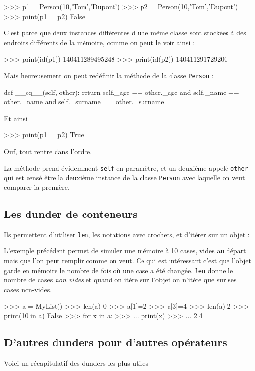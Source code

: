 \documentclass[a4paper,12pt,french]{book}
\begin{document}
\begin{pythonshell}
>>> p1 = Person(10,'Tom','Dupont')
>>> p2 = Person(10,'Tom','Dupont')
>>> print(p1==p2)
False
\end{pythonshell}
C'est parce que deux instances différentes d'une même classe sont stockées à des endroits différents de la mémoire, comme on peut le voir ainsi :
\begin{pythonshell}
>>> print(id(p1))
    140411289495248
>>> print(id(p2))
    140411291729200
\end{pythonshell}
Mais heureusement on peut redéfinir la méthode  de la classe \texttt{Person} :
\begin{pythoncode}
def __eq__(self, other):
    return self._age == other._age and self._name == other._name and self._surname == other._surname
\end{pythoncode}
Et ainsi
\begin{pythonshell}
>>> print(p1==p2)
True
\end{pythonshell}
Ouf, tout rentre dans l'ordre.
\begin{remarque}[]
La méthode  prend évidemment \texttt{self} en paramètre, et un deuxième appelé \texttt{other} qui est censé être la deuxième instance de la classe \texttt{Person} avec laquelle on veut comparer la première.
\end{remarque}
\subsection*{Les dunder de conteneurs}
Ils permettent d'utiliser \texttt{len}, les notations avec crochets, et d'itérer sur un objet :


L'exemple précédent permet de simuler une mémoire à 10 cases, vides au départ mais que l'on peut remplir comme on veut. Ce qui est intéressant c'est que l'objet garde en mémoire le nombre de fois où une case a été changée. \texttt{len} donne le nombre de cases \textit{non vides} et quand on itère sur l'objet on n'itère que sur ses cases non-vides.

\begin{pythonshell}
>>> a = MyList()
>>> len(a)
0
>>> a[1]=2
>>> a[3]=4
>>> len(a)
2
>>> print(10 in a)
False
>>> for x in a:
>>> ...     print(x)
>>> ...
2
4
\end{pythonshell}

\subsection{D'autres dunders pour d'autres opérateurs}
Voici un récapitulatif des dunders les plus utiles
\end{document}
